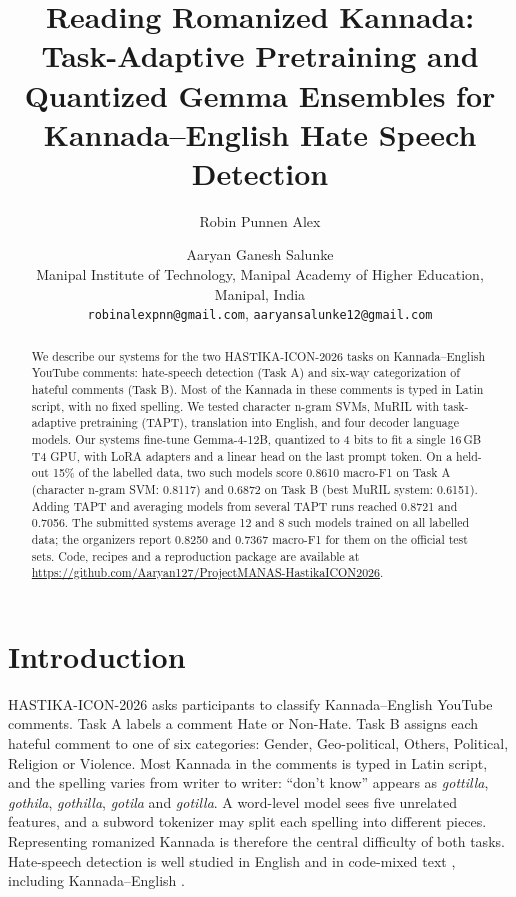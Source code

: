 \documentclass[11pt]{article}
\title{Reading Romanized Kannada: Task-Adaptive Pretraining and Quantized Gemma Ensembles for Kannada--English Hate Speech Detection}
\author{Robin Punnen Alex \and Aaryan Ganesh Salunke \\
  Manipal Institute of Technology, Manipal Academy of Higher Education, Manipal, India \\
  \texttt{robinalexpnn@gmail.com}, \texttt{aaryansalunke12@gmail.com}}
\newcommand{\taska}{Task A}
\newcommand{\taskb}{Task B}
\begin{document}
\maketitle

\begin{abstract}
We describe our systems for the two HASTIKA-ICON-2026 tasks on Kannada--English
YouTube comments: hate-speech detection (\taska{}) and six-way categorization of
hateful comments (\taskb{}). Most of the Kannada in these comments is typed in
Latin script, with no fixed spelling. We tested character n-gram SVMs, MuRIL with
task-adaptive pretraining (TAPT), translation into English, and four decoder
language models. Our systems fine-tune Gemma-4-12B, quantized to 4 bits to fit a
single 16\,GB T4 GPU, with LoRA adapters and a linear head on the last
prompt token. On a held-out 15\% of the labelled data, two such models score
0.8610 macro-F1 on \taska{} (character n-gram SVM: 0.8117) and 0.6872 on \taskb{}
(best MuRIL system: 0.6151). Adding TAPT and averaging models from several TAPT
runs reached 0.8721 and 0.7056. The submitted systems average 12 and 8 such
models trained on all labelled data; the organizers report 0.8250 and 0.7367
macro-F1 for them on the official test sets. Code, recipes and a reproduction
package are available at
\url{https://github.com/Aaryan127/ProjectMANAS-HastikaICON2026}.
\end{abstract}

\section{Introduction}
HASTIKA-ICON-2026 \citep{hastika-2026-starting-kit} asks participants to
classify Kannada--English YouTube comments. \taska{} labels a comment Hate or Non-Hate. \taskb{} assigns each
hateful comment to one of six categories: Gender, Geo-political, Others,
Political, Religion or Violence. Most Kannada in the comments is typed in Latin
script, and the spelling varies from writer to writer: ``don't know'' appears as
\textit{gottilla}, \textit{gothila}, \textit{gothilla}, \textit{gotila} and
\textit{gotilla}. A word-level model sees five unrelated features, and a subword
tokenizer may split each spelling into different pieces. Representing romanized
Kannada is therefore the central difficulty of both tasks. Hate-speech
detection is well studied in English \citep{davidson-etal-2017-automated,
fortuna-nunes-2018-survey} and in code-mixed text \citep{bohra-etal-2018-dataset},
including Kannada--English \citep{hande-etal-2020-kancmd,
chakravarthi-etal-2021-findings-shared, chakravarthi-etal-2022-dravidiancodemix}.
\end{document}
